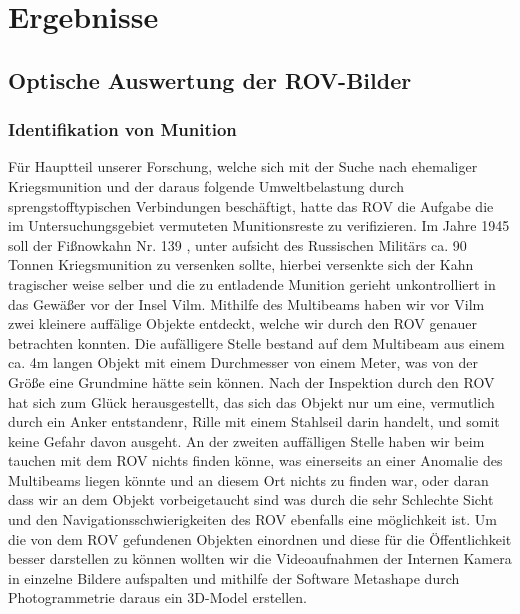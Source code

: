  

\chapter{Ergebnisse}
\section{Optische Auswertung der ROV-Bilder}
\subsection{Identifikation von Munition}
Für Hauptteil unserer Forschung, welche sich mit der Suche nach ehemaliger Kriegsmunition und der daraus folgende Umweltbelastung durch sprengstofftypischen Verbindungen beschäftigt,
hatte das ROV die Aufgabe die im Untersuchungsgebiet vermuteten Munitionsreste zu verifizieren. 
Im Jahre 1945 soll der Fißnowkahn Nr. 139 , unter aufsicht des Russischen Militärs ca. 90 Tonnen Kriegsmunition zu versenken sollte, hierbei versenkte sich der Kahn tragischer weise selber und die zu entladende Munition gerieht unkontrolliert in das Gewäßer vor der Insel Vilm.
Mithilfe des Multibeams haben wir vor Vilm zwei kleinere auffälige Objekte entdeckt, welche wir durch den ROV genauer betrachten konnten. Die aufälligere Stelle bestand auf dem Multibeam aus einem ca. 4m langen Objekt mit einem Durchmesser von einem Meter, was von der Größe eine Grundmine hätte sein können.
Nach der Inspektion durch den ROV hat sich zum Glück herausgestellt, das sich das Objekt nur um eine, vermutlich durch ein Anker entstandenr, Rille mit einem Stahlseil darin handelt, und somit keine Gefahr davon ausgeht.
An der zweiten auffälligen Stelle haben wir beim tauchen mit dem ROV nichts finden könne, was einerseits an einer Anomalie des Multibeams liegen könnte und an diesem Ort nichts zu finden war, oder daran dass wir an dem Objekt vorbeigetaucht sind was durch die sehr Schlechte Sicht und den Navigationsschwierigkeiten des ROV ebenfalls eine möglichkeit ist.
Um die von dem ROV gefundenen Objekten einordnen und diese für die Öffentlichkeit besser darstellen zu können wollten wir die Videoaufnahmen der Internen Kamera in einzelne Bildere aufspalten und mithilfe der Software Metashape durch Photogrammetrie daraus ein 3D-Model erstellen. 
